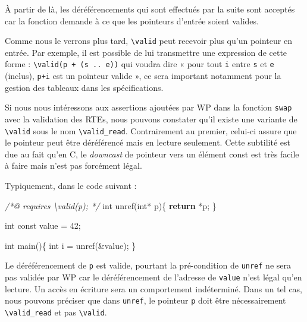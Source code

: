 \documentclass[12pt,francais,]{scrbook}
\newenvironment{Shaded}{}{}
\newcommand{\KeywordTok}[1]{\textcolor[rgb]{0.00,0.44,0.13}{\textbf{{#1}}}}
\newcommand{\DataTypeTok}[1]{\textcolor[rgb]{0.56,0.13,0.00}{{#1}}}
\newcommand{\DecValTok}[1]{\textcolor[rgb]{0.25,0.63,0.44}{{#1}}}
\newcommand{\CommentTok}[1]{\textcolor[rgb]{0.38,0.63,0.69}{\textit{{#1}}}}
\newcommand{\NormalTok}[1]{{#1}}
\begin{document}
À partir de là, les déréférencements qui sont effectués par la suite
sont acceptés car la fonction demande à ce que les pointeurs d'entrée
soient valides.

Comme nous le verrons plus tard, \texttt{\textbackslash{}valid} peut
recevoir plus qu'un pointeur en entrée. Par exemple, il est possible de
lui transmettre une expression de cette forme :
\texttt{\textbackslash{}valid(p\ +\ (s\ ..\ e))} qui voudra dire « pour
tout \texttt{i} entre \texttt{s} et \texttt{e} (inclus), \texttt{p+i}
est un pointeur valide », ce sera important notamment pour la gestion
des tableaux dans les spécifications.

Si nous nous intéressons aux assertions ajoutées par WP dans la fonction
\texttt{swap} avec la validation des RTEs, nous pouvons constater qu'il
existe une variante de \texttt{\textbackslash{}valid} sous le nom
\texttt{\textbackslash{}valid\_read}. Contrairement au premier, celui-ci
assure que le pointeur peut être déréférencé mais en lecture seulement.
Cette subtilité est due au fait qu'en C, le \emph{downcast} de pointeur
vers un élément const est très facile à faire mais n'est pas forcément
légal.

Typiquement, dans le code suivant :

\begin{footnotesize}\begin{Shaded}
\begin{Highlighting}[]
\CommentTok{/*@ requires \textbackslash{}valid(p); */}
\DataTypeTok{int} \NormalTok{unref(}\DataTypeTok{int}\NormalTok{* p)\{}
  \KeywordTok{return} \NormalTok{*p;}
\NormalTok{\}}

\DataTypeTok{int} \DataTypeTok{const} \NormalTok{value = }\DecValTok{42}\NormalTok{;}

\DataTypeTok{int} \NormalTok{main()\{}
  \DataTypeTok{int} \NormalTok{i = unref(&value);}
\NormalTok{\}}
\end{Highlighting}
\end{Shaded}\end{footnotesize}

Le déréférencement de \texttt{p} est valide, pourtant la pré-condition
de \texttt{unref} ne sera pas validée par WP car le déréférencement de
l'adresse de \texttt{value} n'est légal qu'en lecture. Un accès en
écriture sera un comportement indéterminé. Dans un tel cas, nous pouvons
préciser que dans \texttt{unref}, le pointeur \texttt{p} doit être
nécessairement \texttt{\textbackslash{}valid\_read} et pas
\texttt{\textbackslash{}valid}.
\end{document}
